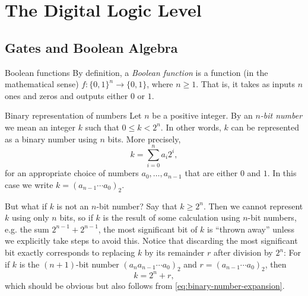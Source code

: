 \documentclass[article, a4paper, 11pt, oneside]{memoir}
\title{\doctitle}
\author{\docauthor}
\numberwithin{equation}{chapter}
\begin{document}
\maketitle

\addtocounter{chapter}{2}
\chapter{The Digital Logic Level}

\section{Gates and Boolean Algebra}

\begin{notelist}
\item[Boolean functions]
By definition, a \emph{Boolean function} is a function (in the mathematical sense) $f \colon \{0,1\}^n \to \{0,1\}$, where $n \geq 1$. That is, it takes as inputs $n$ ones and zeros and outputs either $0$ or $1$.

\item[Binary representation of numbers]
Let $n$ be a positive integer. By an \emph{$n$-bit number} we mean an integer $k$ such that $0 \leq k < 2^n$. In other words, $k$ can be represented as a binary number using $n$ bits. More precisely,
%
\begin{equation}
    \label{eq:binary-number-expansion}
    k = \sum_{i=0}^n a_i 2^i,
\end{equation}
%
for an appropriate choice of numbers $a_0, \ldots, a_{n-1}$ that are either $0$ and $1$. In this case we write $k = (a_{n-1} \cdots a_0)_2$.

But what if $k$ is not an $n$-bit number? Say that $k \geq 2^n$. Then we cannot represent $k$ using only $n$ bits, so if $k$ is the result of some calculation using $n$-bit numbers, e.g. the sum $2^{n-1} + 2^{n-1}$, the most significant bit of $k$ is \enquote{thrown away} unless we explicitly take steps to avoid this. Notice that discarding the most significant bit exactly corresponds to replacing $k$ by its remainder $r$ after division by $2^n$: For if $k$ is the $(n+1)$-bit number $(a_n a_{n-1} \cdots a_0)_2$ and $r = (a_{n-1} \cdots a_0)_2$, then
%
\begin{equation*}
    k = 2^n + r,
\end{equation*}
%
which should be obvious but also follows from \cref{eq:binary-number-expansion}.


\end{notelist}
\end{document}
